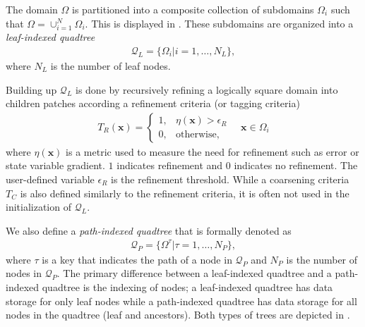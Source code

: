 The domain $\Omega$ is partitioned into a composite collection of subdomains $\Omega_i$ such that $\Omega = \cup_{i = 1}^{N} \Omega_i$. This is displayed in . These subdomains are organized into a {\em leaf-indexed quadtree}
\begin{align}
    \mathcal{Q}_L = \{\Omega_i | i = 1, \dots, N_L\},
    \label{eq:leaf-indexed-quadtree}
\end{align}
where $N_L$ is the number of leaf nodes.  Building up $\mathcal{Q}_L$ is done by recursively refining a logically square domain into children patches according a refinement criteria (or tagging criteria)
\begin{align}
    T_{R} (\textbf{x}) =
    \begin{cases}
        1,& \eta(\textbf{x}) > \epsilon_{R} \\
        0,& \text{otherwise},
    \end{cases}
    \quad \textbf{x} \in \Omega_i
\end{align}
where $\eta(\textbf{x})$ is a metric used to measure the need for refinement such as error or state variable gradient. $1$ indicates refinement and $0$ indicates no refinement. The user-defined variable $\epsilon_{R}$ is the refinement threshold. While a coarsening criteria $T_{C}$ is also defined similarly to the refinement criteria, it is often not used in the initialization of $\mathcal{Q}_L$.

We also define a {\em path-indexed quadtree} that is formally denoted as
\begin{align}
    \mathcal{Q}_P = \{\Omega^{\tau} | \tau = 1, \dots, N_P\},
    \label{eq:path-indexed-quadtree}
\end{align}
where $\tau$ is a key that indicates the path of a node in $\mathcal{Q}_P$ and $N_P$ is the number of nodes in $\mathcal{Q}_P$. The primary difference between a leaf-indexed quadtree and a path-indexed quadtree is the indexing of nodes; a leaf-indexed quadtree has data storage for only leaf nodes while a path-indexed quadtree has data storage for all nodes in the quadtree (leaf and ancestors). Both types of trees are depicted in .

